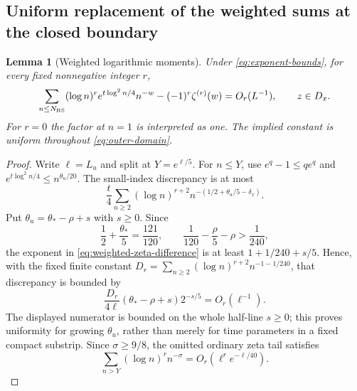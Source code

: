\documentclass[11pt]{article}
\numberwithin{equation}{section}
\newtheorem{lemma}[theorem]{Lemma}
\theoremstyle{definition}
\theoremstyle{remark}
\begin{document}
\subsection{Uniform replacement of the weighted sums at the closed boundary}
\begin{lemma}[Weighted logarithmic moments]\label{lem:weighted-moments}
Under \eqref{eq:exponent-bounds}, for every fixed nonnegative integer $r$,
\begin{equation}
 \sum_{n\le N_{\rm RS}}(\log n)^r e^{t\log^2n/4}n^{-w}
       -(-1)^r\zeta^{(r)}(w)=O_r(L^{-1}),\qquad z\in D_x.
 \label{eq:sum-replacement}
\end{equation}
For $r=0$ the factor at $n=1$ is interpreted as one. The implied
constant is uniform throughout \eqref{eq:outer-domain}.
\end{lemma}
\begin{proof}
Write $\ell=L_u$ and split at $Y=e^{\ell/5}$. For $n\le Y$, use
$e^q-1\le qe^q$ and
$e^{t\log^2n/4}\le n^{\theta_u/20}$. The small-index discrepancy is
at most
\begin{equation}
 \frac t4\sum_{n\ge2}(\log n)^{r+2}
                    n^{-(1/2+\theta_u/5-\delta_x)}.
 \label{eq:weighted-zeta-difference}
\end{equation}
Put $\theta_u=\theta_*-\rho+s$ with $s\ge0$. Since
\[
 \frac12+\frac{\theta_*}{5}=\frac{121}{120},\qquad
 \frac1{120}-\frac\rho5-\rho>\frac1{240},
\]
the exponent in \eqref{eq:weighted-zeta-difference} is at least
$1+1/240+s/5$. Hence, with the fixed finite constant
$D_r=\sum_{n\ge2}(\log n)^{r+2}n^{-1-1/240}$, that discrepancy is
bounded by
\begin{equation}
 \frac{D_r}{4\ell}(\theta_*-\rho+s)2^{-s/5}=O_r(\ell^{-1}).
 \label{eq:uniform-growing-theta}
\end{equation}
The displayed numerator is bounded on the whole half-line $s\ge0$;
this proves uniformity for growing $\theta_u$, rather than merely for
time parameters in a fixed compact substrip. Since $\sigma\ge9/8$,
the omitted ordinary zeta tail satisfies
\begin{equation}
 \sum_{n>Y}(\log n)^r n^{-\sigma}
       =O_r(\ell^r e^{-\ell/40}).
 \label{eq:ordinary-zeta-tail-three}
\end{equation}


\end{proof}
\end{document}
